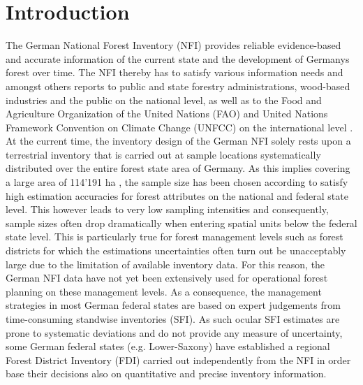 
\section{Introduction} %
\label{sec:intro}

The German National Forest Inventory (NFI) provides reliable evidence-based and accurate information of the current state and the development of Germanys forest over time. The NFI thereby has to satisfy various information needs and amongst others reports to public and state forestry administrations, wood-based industries and the public on the national level, as well as to the Food and Agriculture Organization of the United Nations (FAO) and United Nations Framework Convention on Climate Change (UNFCC) on the international level \citep{polley2010intomppo}. At the current time, the inventory design of the German NFI solely rests upon a terrestrial inventory that is carried out at sample locations systematically distributed over the entire forest state area of Germany. As this implies covering a large area of 114'191 ha \citep{bwi3}, the sample size has been chosen according to satisfy high estimation accuracies for forest attributes on the national and federal state level. This however leads to very low sampling intensities and consequently, sample sizes often drop dramatically when entering spatial units below the federal state level. This is particularly true for forest management levels such as forest districts for which the estimations uncertainties often turn out be unacceptably large due to the limitation of available inventory data. For this reason, the German NFI data have not yet been extensively used for operational forest planning on these management levels. As a consequence, the management strategies in most German federal states are based on expert judgements from time-consuming standwise inventories (SFI). As such ocular SFI estimates are prone to systematic deviations \cite{kulievsis2016} and do not provide any measure of uncertainty, some German federal states (e.g. Lower-Saxony) have established a regional Forest District Inventory (FDI) carried out independently from the NFI \citep{bockmann1998} in order base their decisions also on quantitative and precise inventory information.\par

